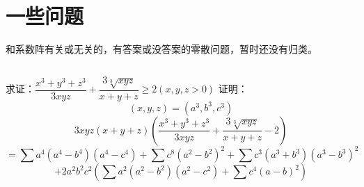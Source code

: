 \documentclass[UTF8]{ctexart}
\begin{document}
\section{一些问题}
和系数阵有关或无关的，有答案或没答案的零散问题，暂时还没有归类。
\subsection{}
求证：$ \displaystyle \dfrac{x^{3}+y^{3}+z^{3}}{3 x y z}+\displaystyle \dfrac{3 \sqrt[3]{x y z}}{x+y+z} \geq 2(x, y, z>0) $
证明：
$$ (x, y, z)=(a^{3}, b^{3}, c^{3}) $$
$$3 x y z(x+y+z)(\displaystyle \dfrac{x^{3}+y^{3}+z^{3}}{3 x y z}+\displaystyle \dfrac{3 \sqrt[3]{x y z}}{x+y+z}-2) $$
$$ =\displaystyle \sum a^{4}(a^{4}-b^{4})(a^{4}-c^{4})+\displaystyle \sum c^{8}(a^{2}-b^{2})^{2}+\displaystyle \sum c^{3}(a^{3}+b^{3})(a^{3}-b^{3})^{2} $$
$$ +2 a^{2} b^{2} c^{2}(\displaystyle \sum a^{2}(a^{2}-b^{2})(a^{2}-c^{2})+\displaystyle \sum c^{4}(a-b)^{2}) $$
\end{document}
